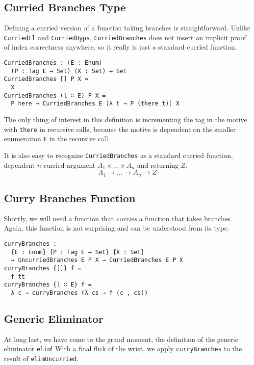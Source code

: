 \documentclass[nonatbib]{sigplanconf}
\begin{document}
\subsection{Curried Branches Type}

Defining a curried version of a function taking branches is
straightforward. Unlike {\tt CurriedEl} and {\tt CurriedHyps},
{\tt CurriedBranches} does not insert an implicit proof of index
correctness anywhere, so it really is just a standard curried
function.

\begin{verbatim}
CurriedBranches : (E : Enum)
  (P : Tag E → Set) (X : Set) → Set
CurriedBranches [] P X =
  X
CurriedBranches (l ∷ E) P X =
  P here → CurriedBranches E (λ t → P (there t)) X
\end{verbatim}

The only thing of interest in this definition is incrementing the tag
in the motive with {\tt there} in recursive calls, because the motive
is dependent on the smaller enumeration {\tt E} in the recursive call.

It is also easy to recognize {\tt CurriedBranches} as a standard
curried function, dependent $n$ curried argument $A_1 × ... × A_n$ and
returning $Z$.
\[
A_1 → ... → A_n → Z
\]

\subsection{Curry Branches Function}

Shortly, we will need a function that {\it curries} a function that
takes branches. Again, this function is not surprising and can be
understood from its type.

\begin{verbatim}
curryBranches :
  {E : Enum} {P : Tag E → Set} {X : Set}
  → UncurriedBranches E P X → CurriedBranches E P X
curryBranches {[]} f =
  f tt
curryBranches {l ∷ E} f =
  λ c → curryBranches (λ cs → f (c , cs))
\end{verbatim}

\subsection{Generic Eliminator}

At long last, we have come to the grand moment, the definition of the
generic eliminator {\tt elim}! With a final flick of the wrist, we
apply {\tt curryBranches} to the result of {\tt elimUncurried}.
\end{document}
